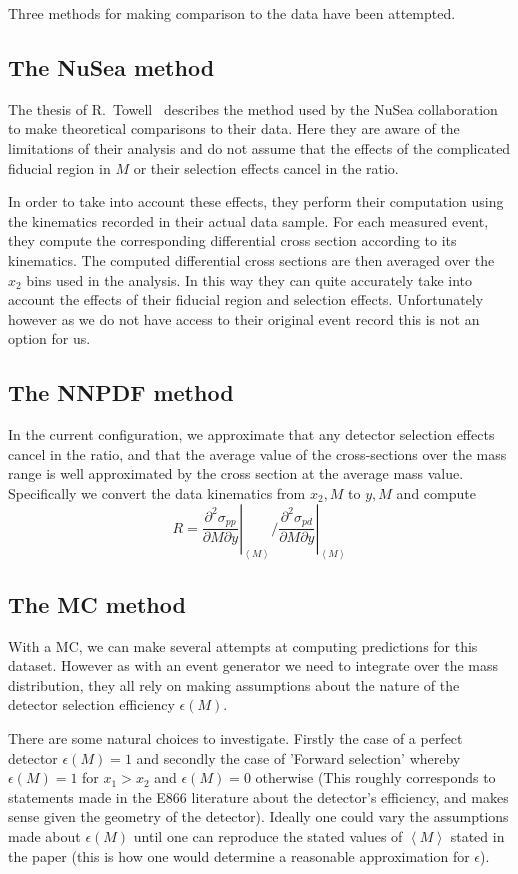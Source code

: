 \documentclass[11pt]{article}
\newcommand{\be}{\begin{equation}}
\newcommand{\ee}{\end{equation}}
\begin{document}
Three methods for making comparison to the data have been attempted.
\subsection{The NuSea method}
The thesis of R.~Towell~\cite{Towell:2001dz} describes the method used by the NuSea collaboration
to make theoretical comparisons to their data. Here they are aware of the limitations of their analysis and do not assume
that the effects of the complicated fiducial region in $M$ or their selection effects cancel in the ratio.

In order to take into account these effects, they perform their computation using the kinematics recorded in their
actual data sample. For each measured event, they compute the corresponding differential cross section according
to its kinematics. The computed differential cross sections are then averaged over the $x_2$ bins used in the analysis.
In this way they can quite accurately take into account the effects of their fiducial region and selection effects. Unfortunately
however as we do not have access to their original event record this is not an option for us.

\subsection{The NNPDF method}
In the current configuration, we approximate that any detector selection effects cancel in the ratio, and
that the average value of the cross-sections over the mass range is well approximated by the cross section at
the average mass value. Specifically we convert the data kinematics from $x_2, M$ to $y, M$ and compute
\be R = \left.\frac{\partial^2\sigma_{pp}}{\partial M \partial y}\right|_{\left<M\right>} \bigg/ \left.\frac{\partial^2\sigma_{pd}}{\partial M \partial y}\right|_{\left<M\right>} \ee

\subsection{The MC method}
With a MC, we can make several attempts at computing predictions for this dataset. However as with an event
generator we need to integrate over the mass distribution, they all rely on making assumptions about the nature 
of the detector selection efficiency $\epsilon(M)$. 

There are some natural choices to investigate. Firstly the case of a perfect detector $\epsilon(M) = 1$ and secondly
the case of 'Forward selection' whereby $\epsilon(M) = 1$ for $x_1>x_2$ and $\epsilon(M) = 0$ otherwise (This roughly
corresponds to statements made in the E866 literature about the detector's efficiency, and makes sense given the
geometry of the detector). Ideally one could vary the assumptions made about $\epsilon(M)$ until one can reproduce
the stated values of $\left<M\right>$ stated in the paper (this is how one would determine a reasonable approximation
for $\epsilon$).
\end{document}
